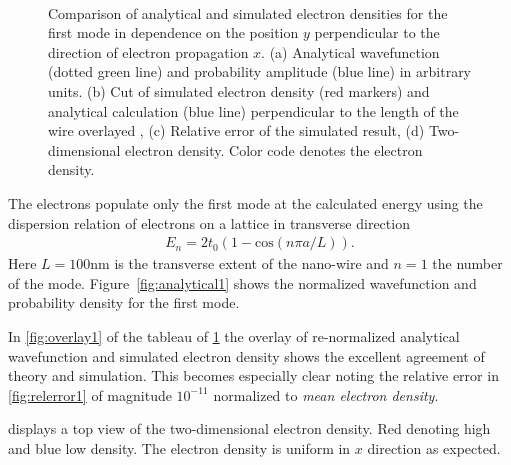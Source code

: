 \begin{figure}[h!]
  \begin{center}
 \qquad
    \\
    \qquad
    \caption{Comparison of analytical and simulated electron densities for the first mode in dependence on the position $y$ perpendicular to the direction of electron propagation $x$. (a) Analytical wavefunction (dotted green line) and probability amplitude (blue line) in arbitrary units. (b) Cut of simulated electron density (red markers) and analytical calculation (blue line) perpendicular to the length of the wire overlayed , (c) Relative error of the simulated result, (d) Two-dimensional electron density. Color code denotes the electron density. }\label{fig:mode1}
  \end{center}
\end{figure}
The electrons populate only the first mode at the calculated energy using the dispersion relation of electrons on a lattice in transverse direction
\begin{align}
E_{n} = 2t_0(1-\text{cos}(n\pi a/L)).
\label{eqn:dispersionlattice}
\end{align}
Here $L=100$nm is the transverse extent of the nano-wire and $n=1$ the number of the mode. Figure~\ref{fig:analytical1} shows the normalized wavefunction and probability density for the first mode.\par
In \cref{fig:overlay1} of the tableau of \cref{fig:mode1} the overlay of re-normalized analytical wavefunction and simulated electron density shows the excellent agreement of theory and simulation. This becomes especially clear noting the relative error in \cref{fig:relerror1} of magnitude $10^{-11}$ normalized to \emph{mean electron density}.\par
{} displays a top view of the two-dimensional electron density. Red denoting high and blue low density. The electron density is uniform in $x$ direction as expected.\par
